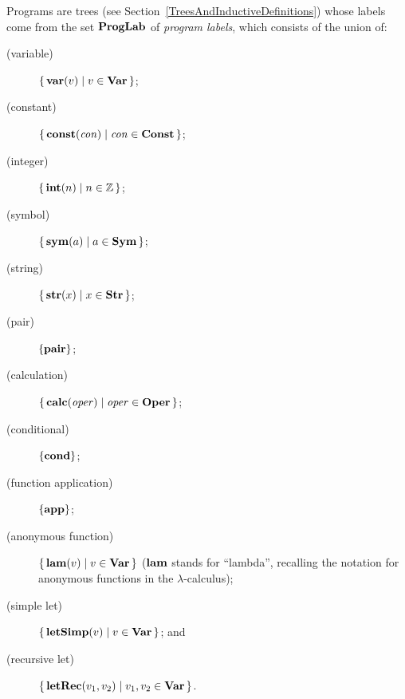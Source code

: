 Programs are trees (see Section~\ref{TreesAndInductiveDefinitions})
whose labels come from the set $\mathbf{ProgLab}$ of \emph{program labels},
which consists of the union of:
\begin{description}
\item[\quad(variable)] $\{ \, \mathbf{var}(v) \mid v\in\mathbf{Var} \, \}$;

\item[\quad(constant)] $\{ \, \mathbf{const}(\mathit{con}) \mid \mathit{con}\in\mathbf{Const} \, \}$;

\item[\quad(integer)] $\{ \, \mathbf{int}(n) \mid n\in\mathbb{Z} \, \}$;

\item[\quad(symbol)] $\{ \, \mathbf{sym}(a) \mid a\in\mathbf{Sym} \, \}$;

\item[\quad(string)] $\{ \, \mathbf{str}(x) \mid x\in\mathbf{Str} \, \}$;

\item[\quad(pair)] $\{\mathbf{pair}\}$;

\item[\quad(calculation)]
  $\{ \, \mathbf{calc}(\mathit{oper}) \mid \mathit{oper}\in\mathbf{Oper} \, \}$;

\item[\quad(conditional)] $\{\mathbf{cond}\}$;

\item[\quad(function application)] $\{\mathbf{app}\}$;

\item[\quad(anonymous function)] $\{ \, \mathbf{lam}(v) \mid v\in\mathbf{Var} \, \}$
  ($\mathbf{lam}$ stands for ``lambda'', recalling the notation for
  anonymous functions in the $\lambda$-calculus);

\item[\quad(simple let)] $\{ \, \mathbf{letSimp}(v) \mid v\in\mathbf{Var} \, \}$; and

\item[\quad(recursive let)] $\{ \, \mathbf{letRec}(v_1,v_2) \mid v_1,v_2\in\mathbf{Var} \, \}$.
\end{description}


